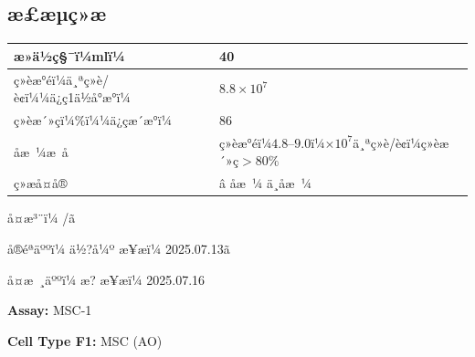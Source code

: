 \documentclass[UTF8,10pt,a4paper,fontset=fandol]{ctexart}
\newcommand{\fieldvalue}[1]{#1}
\newcommand{\handwritten}[1]{#1}
\begin{document}
\subsection*{æ£æµç»æ}

\begin{tabularx}{\textwidth}{|l|X|}
\hline
æ»ä½ç§¯ï¼mlï¼ &
\fieldvalue{\handwritten{40}}\\
\hline
ç»èæ°éï¼ä¸ªç»è/è¢ï¼¼ä¿ç1ä½å°æ°ï¼ &
\fieldvalue{\handwritten{$8.8\times10^{7}$}}\\
\hline
ç»èæ´»çï¼\%ï¼¼ä¿çæ´æ°ï¼ &
\fieldvalue{\handwritten{86}}\\
\hline
åæ ¼æ å &
ç»èæ°éï¼$4.8$--$9.0$ï¼$\times10^{7}$ä¸ªç»è/è¢ï¼ç»èæ´»ç$>80\%$\\
\hline
ç»æå¤å® &
\fieldvalue{\handwritten{â åæ ¼}} \quad ä¸åæ ¼\\
\hline
\end{tabularx}

å¤æ³¨ï¼
\fieldvalue{\handwritten{/}}ã

å®éªäººï¼
\fieldvalue{\handwritten{ä½?å¼º}}
\qquad
æ¥æï¼
\fieldvalue{\handwritten{2025.07.13}}ã

å¤æ ¸äººï¼
\fieldvalue{\handwritten{æ?}}
\qquad
æ¥æï¼
\fieldvalue{\handwritten{2025.07.16}}

\newpage

\noindent
\textbf{Assay:}
\fieldvalue{MSC-1}

\medskip

\noindent
\textbf{Cell Type F1:}
\fieldvalue{MSC (AO)}
\end{document}
